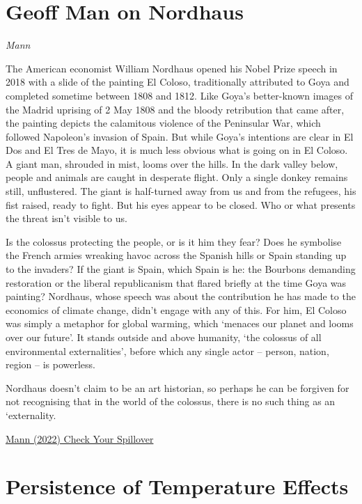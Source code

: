\documentclass[
]{book}
\begin{document}
\hypertarget{geoff-man-on-nordhaus}{%
\section{Geoff Man on Nordhaus}\label{geoff-man-on-nordhaus}}

\emph{Mann}

The \hspace{0pt} American economist William Nordhaus opened his Nobel Prize speech in 2018 with a slide of the painting El Coloso, traditionally attributed to Goya and completed sometime between 1808 and 1812. Like Goya's better-known images of the Madrid uprising of 2 May 1808 and the bloody retribution that came after, the painting depicts the calamitous violence of the Peninsular War, which followed Napoleon's invasion of Spain. But while Goya's intentions are clear in El Dos and El Tres de Mayo, it is much less obvious what is going on in El Coloso. A giant man, shrouded in mist, looms over the hills. In the dark valley below, people and animals are caught in desperate flight. Only a single donkey remains still, unflustered. The giant is half-turned away from us and from the refugees, his fist raised, ready to fight. But his eyes appear to be closed. Who or what presents the threat isn't visible to us.

Is the colossus protecting the people, or is it him they fear? Does he symbolise the French armies wreaking havoc across the Spanish hills or Spain standing up to the invaders? If the giant is Spain, which Spain is he: the Bourbons demanding restoration or the liberal republicanism that flared briefly at the time Goya was painting? Nordhaus, whose speech was about the contribution he has made to the economics of climate change, didn't engage with any of this. For him, El Coloso was simply a metaphor for global warming, which `menaces our planet and looms over our future'. It stands outside and above humanity, `the colossus of all environmental externalities', before which any single actor -- person, nation, region -- is powerless.

Nordhaus doesn't claim to be an art historian, so perhaps he can be forgiven for not recognising that in the world of the colossus, there is no such thing as an `externality.

\href{https://www.lrb.co.uk/the-paper/v44/n03/geoff-mann/check-your-spillover}{Mann (2022) Check Your Spillover}

\hypertarget{persistence-of-temperature-effects}{%
\section{Persistence of Temperature Effects}\label{persistence-of-temperature-effects}}
\end{document}
